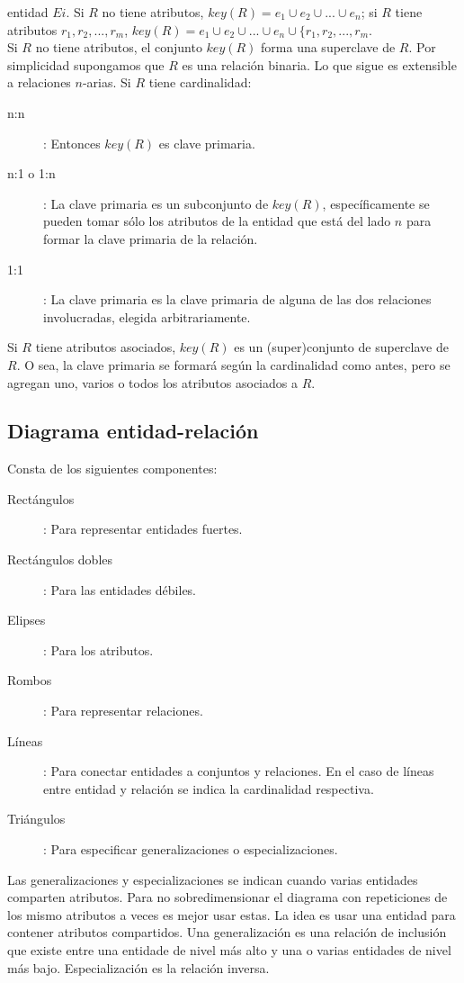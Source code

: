 \documentclass[a4paper]{article}
\begin{document}
entidad $Ei$. Si $R$ no tiene atributos, $key(R) = e_{1} \cup e_{2} \cup ... \cup e_{n}$;
si $R$ tiene atributos $r_{1}, r_{2}, ..., r_{m}$, $key(R) = e_{1} \cup e_{2} \cup ...
\cup e_{n} \cup \{r_{1}, r_{2}, ..., r_{m}$. \\
Si $R$ no tiene atributos, el conjunto $key(R)$ forma una superclave de $R$.
Por simplicidad supongamos que $R$ es una relaci\'on binaria. Lo que sigue es extensible
a relaciones $n$-arias.
Si $R$ tiene cardinalidad:
\begin{description}
    \item[n:n]: Entonces $key(R)$ es clave primaria.
    \item[n:1 o 1:n]: La clave primaria es un subconjunto de $key(R)$, espec\'ificamente
    se pueden tomar s\'olo los atributos de la entidad que est\'a del lado $n$ para formar
    la clave primaria de la relaci\'on.
    \item[1:1]: La clave primaria es la clave primaria de alguna de las dos relaciones
    involucradas, elegida arbitrariamente.
\end{description}
Si $R$ tiene atributos asociados, $key(R)$ es un (super)conjunto de superclave de $R$. O sea,
la clave primaria se formar\'a seg\'un la cardinalidad como antes, pero se agregan uno,
varios o todos los atributos asociados a $R$.

\subsection{Diagrama entidad-relaci\'on}
Consta de los siguientes componentes:
\begin{description}
    \item[Rect\'angulos]: Para representar entidades fuertes.
    \item[Rect\'angulos dobles]: Para las entidades d\'ebiles.
    \item[Elipses]: Para los atributos.
    \item[Rombos]: Para representar relaciones.
    \item[L\'ineas]: Para conectar entidades a conjuntos y relaciones. En el caso de l\'ineas
    entre entidad y relaci\'on se indica la cardinalidad respectiva.
    \item[Tri\'angulos]: Para especificar generalizaciones o especializaciones.
\end{description}
Las generalizaciones y especializaciones se indican cuando varias entidades comparten
atributos. Para no sobredimensionar el diagrama con repeticiones de los mismo atributos
a veces es mejor usar estas. La idea es usar una entidad para contener atributos compartidos.
Una generalizaci\'on es una relaci\'on de inclusi\'on que existe entre una entidade de nivel
m\'as alto y una o varias entidades de nivel m\'as bajo. Especializaci\'on es la relaci\'on
inversa.
\end{document}
